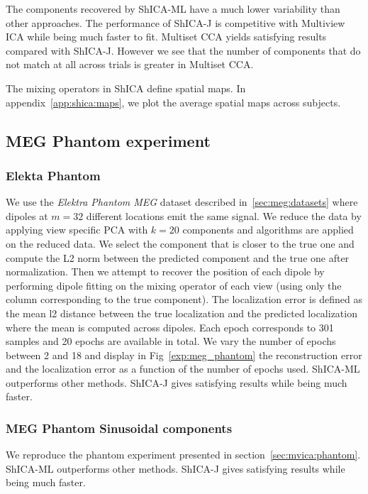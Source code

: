 The components recovered by ShICA-ML have a much lower variability than other approaches. The performance of ShICA-J is competitive with Multiview ICA while being much faster to fit. Multiset CCA yields satisfying results compared with ShICA-J. However we see that the number of components that do not match at all across trials is greater in Multiset CCA.

The mixing operators in ShICA define spatial maps. In appendix~\ref{app:shica:maps}, we plot
the average spatial maps across subjects.


\subsection{MEG Phantom experiment}
\label{app:phantom}
\subsubsection{Elekta Phantom}
We use the \emph{Elektra Phantom MEG} dataset described
in~\ref{sec:meg:datasets} where dipoles at $m=32$ different locations emit the
same signal.
    We reduce the data by applying view specific PCA with $k=20$ components and algorithms are applied on the reduced data. We select the component that is closer to the true one and compute the L2 norm between the predicted component and the true one after normalization.
    Then we attempt to recover the position of each dipole by performing dipole fitting on the mixing operator of each view (using only the column corresponding to the true component). The localization error is defined as the mean l2 distance between the true localization and the predicted localization where the mean is computed across dipoles. 
    Each epoch corresponds to 301 samples and 20 epochs are available in total. We vary the number of epochs between 2 and 18 and display in Fig~\ref{exp:meg_phantom} the reconstruction error and the localization error as a function of the number of epochs used.
    ShICA-ML outperforms other methods. ShICA-J gives satisfying results while being much faster.
    
    \subsubsection{MEG Phantom Sinusoidal components}
    We reproduce the phantom experiment presented in section~\ref{sec:mvica:phantom}. ShICA-ML outperforms other methods. ShICA-J gives satisfying results while being much faster.
    

